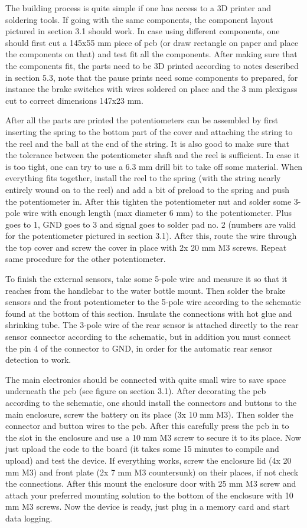 \documentclass[a4paper,11pt]{article} %
\begin{document}
The building process is quite simple if one has access to a 3D printer and soldering tools. If going with the same components, the component layout pictured in section 3.1 should work. In case using different components, one should first cut a 145x55 mm piece of pcb (or draw rectangle on paper and place the components on that) and test fit all the components. After making sure that the components fit, the parts need to be 3D printed according to notes described in section 5.3, note that the pause prints need some components to prepared, for instance the brake switches with wires soldered on place and the 3 mm plexigass cut to correct dimensions 147x23 mm.

After all the parts are printed the potentiometers can be assembled by first inserting the spring to the bottom part of the cover and attaching the string to the reel and the ball at the end of the string. It is also good to make sure that the tolerance between the potentiometer shaft and the reel is sufficient. In case it is too tight, one can try to use a 6.3 mm drill bit to take off some material. When everything fits together, install the reel to the spring (with the string nearly entirely wound on to the reel) and add a bit of preload to the spring and push the potentiometer in. After this tighten the potentiometer nut and solder some 3-pole wire with enough length (max diameter 6 mm) to the potentiometer. Plus goes to 1, GND goes to 3 and signal goes to solder pad no. 2 (numbers are valid for the potentiometer pictured in section 3.1). After this, route the wire through the top cover and screw the cover in place with 2x 20 mm M3 screws. Repeat same procedure for the other potentiometer.

To finish the external sensors, take some 5-pole wire and measure it so that it reaches from the handlebar to the water bottle mount. Then solder the brake sensors and the front potentiometer to the 5-pole wire according to the schematic found at the bottom of this section. Insulate the connections with hot glue and shrinking tube. The 3-pole wire of the rear sensor is attached directly to the rear sensor connector according to the schematic, but in addition you must connect the pin 4 of the connector to GND, in order for the automatic rear sensor detection to work.

The main electronics should be connected with quite small wire to save space underneath the pcb (see figure on section 3.1). After decorating the pcb according to the schematic, one should install the connectors and buttons to the main enclosure, screw the battery on its place (3x 10 mm M3). Then solder the connector and button wires to the pcb. After this carefully press the pcb in to the slot in the enclosure and use a 10 mm M3 screw to secure it to its place. Now just upload the code to the board (it takes some 15 minutes to compile and upload) and test the device. If everything works, screw the enclosure lid (4x 20 mm M3) and front plate (2x 7 mm M3 countersunk) on their places, if not check the connections. After this mount the enclosure door with 25 mm M3 screw and attach your preferred mounting solution to the bottom of the enclosure with 10 mm M3 screws. Now the device is ready, just plug in a memory card and start data logging.
\end{document}
